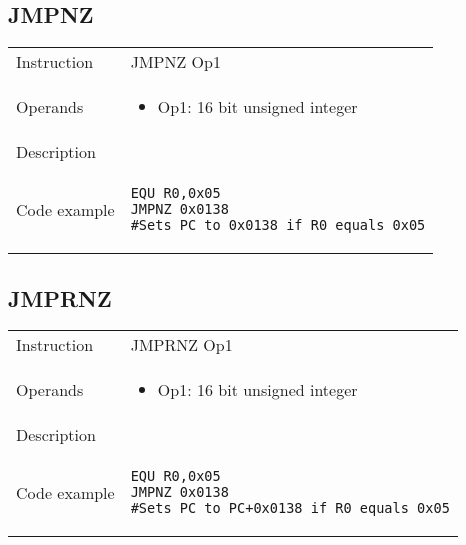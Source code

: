 \newpage

\subsection{JMPNZ}
\renewcommand*{\arraystretch}{2.0}
\begin{longtable}{P{3cm}P{9cm}}
\midrule
\noindent Instruction & JMPNZ Op1 \\
\noindent Operands &
\begin{itemize}[label={},noitemsep,leftmargin=*,topsep=0pt,partopsep=0pt, itemsep=1em]
\item Op1: 16 bit unsigned integer
\end{itemize}\\
\noindent Description &  \\
\noindent Code example & 
\begin{lstlisting}
EQU R0,0x05
JMPNZ 0x0138
#Sets PC to 0x0138 if R0 equals 0x05
\end{lstlisting} \\
\end{longtable}


\subsection{JMPRNZ}
\renewcommand*{\arraystretch}{2.0}
\begin{longtable}{P{3cm}P{9cm}}
\midrule
\noindent Instruction & JMPRNZ Op1 \\
\noindent Operands &
\begin{itemize}[label={},noitemsep,leftmargin=*,topsep=0pt,partopsep=0pt, itemsep=1em]
\item Op1: 16 bit unsigned integer
\end{itemize}\\
\noindent Description &  \\
\noindent Code example & 
\begin{lstlisting}
EQU R0,0x05
JMPNZ 0x0138
#Sets PC to PC+0x0138 if R0 equals 0x05
\end{lstlisting} \\
\end{longtable}

\newpage

